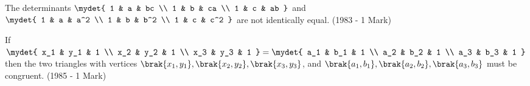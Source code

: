 \iffalse
\title{Assignment 2}
\author{AI24BTECH11031 - Shivram S}
\section{true-false}
\fi

	\item The determinants $\mydet{
			1 & a & bc \\
			1 & b & ca \\
			1 & c & ab
		}$ and $\mydet{
			1 & a & a^2 \\
			1 & b & b^2 \\
			1 & c & c^2
		}$ are not identically equal.
		\hfill (1983 - 1 Mark)
	
	\item If $\mydet{
			x_1 & y_1 & 1 \\
			x_2 & y_2 & 1 \\
			x_3 & y_3 & 1
		} = \mydet {
			a_1 & b_1 & 1 \\
			a_2 & b_2 & 1 \\
			a_3 & b_3 & 1
		}$ then the two triangles with vertices	
		$\brak{x_1, y_1}, \brak{x_2, y_2}, \brak{x_3, y_3}$,
		and $\brak{a_1, b_1}, \brak{a_2, b_2}, \brak{a_3, b_3}$
		must be congruent.
		\hfill (1985 - 1 Mark)

